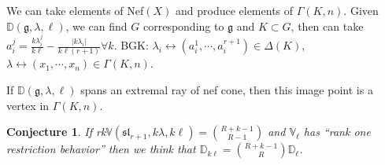 \documentclass[12pt]{article}
\newcommand{\VV}{\mathbb{V}}
\newcommand{\DD}{\mathbb{D}}
\newtheorem{conjecture}[theorem]{Conjecture}
\begin{document}
We can take elements of Nef$(X)$ and produce elements of $\Gamma(K,n)$.   Given $\DD(\mathfrak{g},\lambda,\ell)$, we can find $G$ corresponding to $\mathfrak{g}$ and $K \subset G$, then can take $a_i^j = \frac{k\lambda_i^j}{k\ell}-\frac{|k\lambda_i|}{k\ell(r+1)} \forall k$.  BGK: $\lambda_i \leftrightarrow (a_i^1,\cdots,a_i^{r+1}) \in \Delta(K)$, $\lambda \leftrightarrow (x_1,\cdots,x_n) \in \Gamma(K,n)$.

If $\DD(\mathfrak{g},\lambda,\ell)$ spans an extremal ray of nef cone, then this image point is a vertex in $\Gamma(K,n)$.

\begin{conjecture}
If rk$\VV(\mathfrak{sl}_{r+1},k \lambda,k \ell) = \binom{R+k-1}{R-1}$ and $\VV_{\ell}$ has ``rank one restriction behavior'' then we think that $\DD_{k\ell} = \binom{R+k-1}{R} \DD_{\ell}$.
\end{conjecture}
\end{document}
